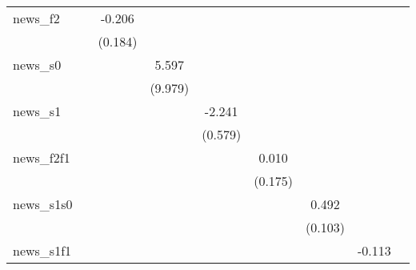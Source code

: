 {\begin{tabular}{l*{8}{c}}
\addlinespace
news\_f2     &                     &      -0.206         &                     &                     &                     &                     &                     &                     \\
            &                     &     (0.184)         &                     &                     &                     &                     &                     &                     \\
\addlinespace
news\_s0     &                     &                     &       5.597         &                     &                     &                     &                     &                     \\
            &                     &                     &     (9.979)         &                     &                     &                     &                     &                     \\
\addlinespace
news\_s1     &                     &                     &                     &      -2.241\sym{***}&                     &                     &                     &                     \\
            &                     &                     &                     &     (0.579)         &                     &                     &                     &                     \\
\addlinespace
news\_f2f1   &                     &                     &                     &                     &       0.010         &                     &                     &                     \\
            &                     &                     &                     &                     &     (0.175)         &                     &                     &                     \\
\addlinespace
news\_s1s0   &                     &                     &                     &                     &                     &       0.492\sym{***}&                     &                     \\
            &                     &                     &                     &                     &                     &     (0.103)         &                     &                     \\
\addlinespace
news\_s1f1   &                     &                     &                     &                     &                     &                     &      -0.113         &                     \\

\end{tabular}}
